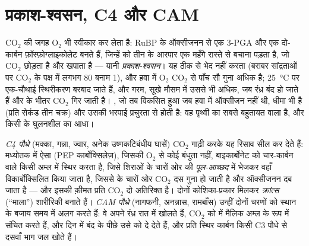 \section{प्रकाश-श्वसन, C4 और CAM}

\begin{proposition}[RuBisCO का दोष]\label{prop:b1:photosynthesis:photorespiration}
 $\mathrm{CO_2}$ की जगह $\mathrm{O_2}$ भी स्वीकार कर लेता है:
RuBP के ऑक्सीजनन से एक 3-PGA और एक दो-कार्बन फ़ॉस्फ़ोग्लाइकोलेट बनते हैं,
जिन्हें  को तीन  के आरपार एक महँगे रास्ते से बचाना पड़ता
है, जो $\mathrm{CO_2}$ छोड़ता है और  खपाता है ---
यानी \emph{प्रकाश-श्वसन}। यह  ठीक से भेद नहीं करता (बराबर
सांद्रताओं पर $\mathrm{CO_2}$ के पक्ष में लगभग \qty{80}{} बनाम 1),
और हवा में $\mathrm{O_2}$ $\mathrm{CO_2}$ से पाँच सौ गुना अधिक है;
\qty{25}{\celsius} पर एक-चौथाई स्थिरीकरण बरबाद जाते हैं, और गरम, सूखे
मौसम में उससे भी अधिक, जब रंध्र बंद हो जाते हैं और  के भीतर
$\mathrm{CO_2}$ गिर जाती है। , जो तब विकसित हुआ जब हवा में
ऑक्सीजन नहीं थी, धीमा भी है (प्रति सेकंड तीन चक्र) और उसकी भरपाई
प्रचुरता से होती है: वह पृथ्वी का सबसे बहुतायत वाला  है, और किसी
 के घुलनशील  का आधा।
\end{proposition}

\begin{definition}[C4 और CAM पौधे]\label{def:b1:photosynthesis:c4cam}
\emph{C4 पौधे} (मक्का, गन्ना, ज्वार, अनेक उष्णकटिबंधीय घासें)
$\mathrm{CO_2}$ गाढ़ी करके यह रिसाव सील कर देते हैं: मध्योतक  में
ऐसा  (PEP कार्बोक्सिलेज़), जिसकी $\mathrm{O_2}$ से कोई बंधुता नहीं,
बाइकार्बोनेट को चार-कार्बन वाले किसी अम्ल में स्थिर करता है, जिसे शिराओं
के चारों ओर की \emph{पूल-आच्छद}  में भेजकर वहाँ विकार्बोक्सिलित
किया जाता है, जिससे  के चारों ओर $\mathrm{CO_2}$ दस गुना हो जाती
है और ऑक्सीजनन दब जाता है --- और इसकी क़ीमत प्रति $\mathrm{CO_2}$ दो
अतिरिक्त  है। दोनों कोशिका-प्रकार मिलकर \emph{क्रांत्स} (``माला'')
शारीरिकी बनाते हैं। \emph{CAM पौधे}
(नागफनी, अनन्नास, रामबाँस) उन्हीं दोनों चरणों को स्थान के बजाय समय में
अलग करते हैं: वे अपने रंध्र रात में खोलते हैं, $\mathrm{CO_2}$ को
 में मैलिक अम्ल के रूप में संचित करते हैं, और दिन में बंद  के
पीछे उसे  को दे देते हैं, और प्रति स्थिर कार्बन किसी C3 पौधे से
दसवाँ भाग जल खोते हैं।
\end{definition}

